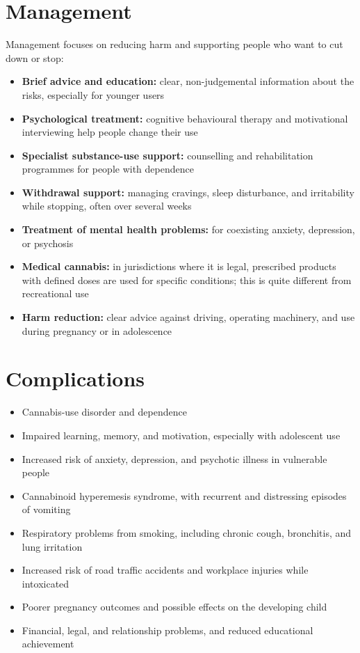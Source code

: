 \section*{Management}
Management focuses on reducing harm and supporting people who want to cut down or stop:
\begin{itemize}
    \item \textbf{Brief advice and education:} clear, non-judgemental information about the risks, especially for younger users
    \item \textbf{Psychological treatment:} cognitive behavioural therapy and motivational interviewing help people change their use
    \item \textbf{Specialist substance-use support:} counselling and rehabilitation programmes for people with dependence
    \item \textbf{Withdrawal support:} managing cravings, sleep disturbance, and irritability while stopping, often over several weeks
    \item \textbf{Treatment of mental health problems:} for coexisting anxiety, depression, or psychosis
    \item \textbf{Medical cannabis:} in jurisdictions where it is legal, prescribed products with defined doses are used for specific conditions; this is quite different from recreational use
    \item \textbf{Harm reduction:} clear advice against driving, operating machinery, and use during pregnancy or in adolescence
\end{itemize}

\section*{Complications}
\begin{itemize}
    \item Cannabis-use disorder and dependence
    \item Impaired learning, memory, and motivation, especially with adolescent use
    \item Increased risk of anxiety, depression, and psychotic illness in vulnerable people
    \item Cannabinoid hyperemesis syndrome, with recurrent and distressing episodes of vomiting
    \item Respiratory problems from smoking, including chronic cough, bronchitis, and lung irritation
    \item Increased risk of road traffic accidents and workplace injuries while intoxicated
    \item Poorer pregnancy outcomes and possible effects on the developing child
    \item Financial, legal, and relationship problems, and reduced educational achievement
\end{itemize}


